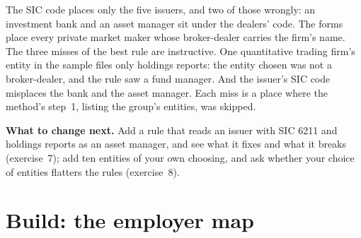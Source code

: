 \begin{omfigure}

\label{fig:in:a-map-of-the-industry:acc}
\end{omfigure}

The SIC code places only the five issuers, and two of those wrongly: an investment bank and an asset manager sit under
the dealers' code. The forms place every private market maker whose broker-dealer carries the firm's name. The three
misses of the best rule are instructive. One quantitative trading firm's entity in the sample files only holdings
reports: the entity chosen was not a broker-dealer, and the rule saw a fund manager. And the issuer's SIC code misplaces
the bank and the asset manager. Each miss is a place where the method's step~1, listing the group's entities, was
skipped.

\textbf{What to change next.} Add a rule that reads an issuer with SIC 6211 and holdings reports as an asset manager, and
see what it fixes and what it breaks (exercise~7); add ten entities of your own choosing, and ask whether your choice of
entities flatters the rules (exercise~8).

\section{Build: the employer map}\label{bld:in:a-map-of-the-industry:industrymap}


